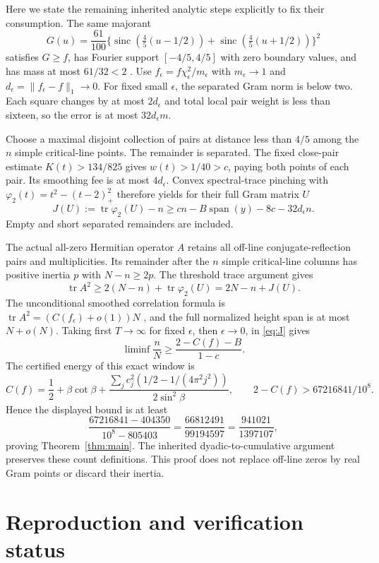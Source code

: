 \documentclass[11pt,a4paper]{article}
\DeclareMathOperator{\tr}{tr}
\DeclareMathOperator{\sinc}{sinc}
\begin{document}
Here we state the remaining inherited analytic steps explicitly to
fix their consumption. The same majorant
\[
 G(u)=\frac{61}{100}
 \{\sinc(\tfrac45(u-1/2))+\sinc(\tfrac45(u+1/2))\}^2
\]
satisfies $G\ge f$, has Fourier support $[-4/5,4/5]$ with zero
boundary values, and has mass at most $61/32<2$ \cite{Lossless,Joint}.
Use $f_\epsilon=f\chi_\epsilon^2/m_\epsilon$ with
$m_\epsilon\to1$ and $d_\epsilon=\|f_\epsilon-f\|_1\to0$.
For fixed small $\epsilon$, the separated Gram norm is below two.
Each square changes by at most $2d_\epsilon$ and total local pair
weight is less than sixteen, so the error is at most
$32d_\epsilon m$.

Choose a maximal disjoint collection of pairs at distance less than
$4/5$ among the $n$ simple critical-line points. The remainder is
separated. The fixed close-pair estimate
$K(t)>134/825$ gives $w(t)>1/40>c$, paying both points of each
pair. Its smoothing fee is at most $4d_\epsilon$.
Convex spectral-trace pinching with
$\varphi_2(t)=t^2-(t-2)_+^2$ therefore yields for their full Gram
matrix $U$
\begin{equation}\label{eq:J}
 J(U):=\tr\varphi_2(U)-n
 \ge cn-B\operatorname{span}(y)-8c-32d_\epsilon n.
\end{equation}
Empty and short separated remainders are included.

The actual all-zero Hermitian operator $A$ retains all off-line
conjugate-reflection pairs and multiplicities. Its remainder after
the $n$ simple critical-line columns has positive inertia $p$ with
$N-n\ge2p$. The threshold trace argument \cite{Joint,Knaus} gives
\[
 \tr A^2\ge 2(N-n)+\tr\varphi_2(U)=2N-n+J(U).
\]
The unconditional smoothed correlation formula is
$\tr A^2=(C(f_\epsilon)+o(1))N$ \cite{BGST,Lamzouri}, and the
full normalized height span is at most $N+o(N)$. Taking first
$T\to\infty$ for fixed $\epsilon$, then $\epsilon\to0$, in
\eqref{eq:J} gives
\[
 \liminf\frac{n}{N}\ge\frac{2-C(f)-B}{1-c}.
\]
The certified energy of this exact window is
\[
 C(f)=\frac12+\beta\cot\beta+
 \frac{\sum_jc_j^2(1/2-1/(4\pi^2j^2))}{2\sin^2\beta},
 \qquad 2-C(f)>67216841/10^8.
\]
Hence the displayed bound is at least
\[
 \frac{67216841-404350}{10^8-805403}
 =\frac{66812491}{99194597}=\frac{941021}{1397107},
\]
proving Theorem~\ref{thm:main}. The inherited dyadic-to-cumulative
argument preserves these count definitions. This proof does not
replace off-line zeros by real Gram points or discard their inertia.

\section{Reproduction and verification status}\label{sec:trust}
\end{document}
